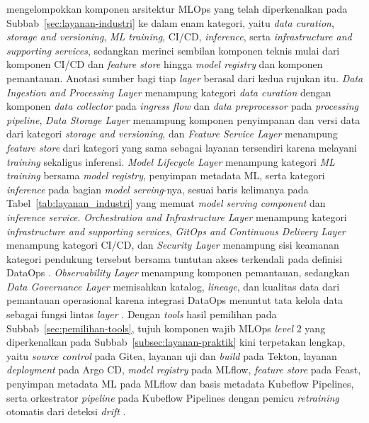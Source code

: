 \textcite{najafabadi2024analysis} mengelompokkan komponen arsitektur MLOps yang telah diperkenalkan pada Subbab~\ref{sec:layanan-industri} ke dalam enam kategori, yaitu \textit{data curation}, \textit{storage and versioning}, \textit{ML training}, CI/CD, \textit{inference}, serta \textit{infrastructure and supporting services}, sedangkan \textcite{kreuzberger2023mlops} merinci sembilan komponen teknis mulai dari komponen CI/CD dan \textit{feature store} hingga \textit{model registry} dan komponen pemantauan. Anotasi sumber bagi tiap \textit{layer} berasal dari kedua rujukan itu. \textit{Data Ingestion and Processing Layer} menampung kategori \textit{data curation} dengan komponen \textit{data collector} pada \textit{ingress flow} dan \textit{data preprocessor} pada \textit{processing pipeline}, \textit{Data Storage Layer} menampung komponen penyimpanan dan versi data dari kategori \textit{storage and versioning}, dan \textit{Feature Service Layer} menampung \textit{feature store} dari kategori yang sama sebagai layanan tersendiri karena melayani \textit{training} sekaligus inferensi. \textit{Model Lifecycle Layer} menampung kategori \textit{ML training} bersama \textit{model registry}, penyimpan metadata ML, serta kategori \textit{inference} pada bagian \textit{model serving}-nya, sesuai baris kelimanya pada Tabel~\ref{tab:layanan_industri} yang memuat \textit{model serving component} dan \textit{inference service}. \textit{Orchestration and Infrastructure Layer} menampung kategori \textit{infrastructure and supporting services}, \textit{GitOps and Continuous Delivery Layer} menampung kategori CI/CD, dan \textit{Security Layer} menampung sisi keamanan kategori pendukung tersebut bersama tuntutan akses terkendali pada definisi DataOps \autocite{munappy2020adhoc}. \textit{Observability Layer} menampung komponen pemantauan, sedangkan \textit{Data Governance Layer} memisahkan katalog, \textit{lineage}, dan kualitas data dari pemantauan operasional karena integrasi DataOps menuntut tata kelola data sebagai fungsi lintas \textit{layer} \autocite{munappy2020adhoc}. Dengan \textit{tools} hasil pemilihan pada Subbab~\ref{sec:pemilihan-tools}, tujuh komponen wajib MLOps \textit{level} 2 yang diperkenalkan pada Subbab~\ref{subsec:layanan-praktik} kini terpetakan lengkap, yaitu \textit{source control} pada Gitea, layanan uji dan \textit{build} pada Tekton, layanan \textit{deployment} pada Argo CD, \textit{model registry} pada MLflow, \textit{feature store} pada Feast, penyimpan metadata ML pada MLflow dan basis metadata Kubeflow Pipelines, serta orkestrator \textit{pipeline} pada Kubeflow Pipelines dengan pemicu \textit{retraining} otomatis dari deteksi \textit{drift} \autocite{googlecloud2024mlops}.

